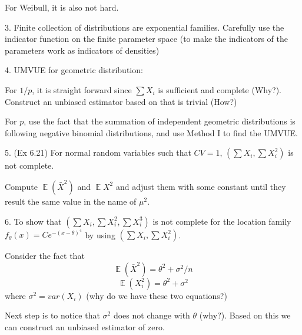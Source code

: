 \documentclass[12pt]{article}
\newcommand{\E}{\operatorname{\mathbb{E}}}
\begin{document}
For Weibull, it is also not hard.

3. Finite collection of distributions are exponential families. Carefully use the indicator function on the finite parameter space (to make the indicators of the parameters work as indicators of densities)

4. UMVUE for geometric distribution:

For $1/p$, it is straight forward since $\sum X_i$ is sufficient and complete (Why?). Construct an unbiased estimator based on that is trivial (How?)

For $p$, use the fact that the summation of independent geometric distributions is following negative binomial distributions, and use Method I to find the UMVUE.

5. (Ex 6.21) For normal random variables such that $CV = 1$, $(\sum X_i, \sum X^2_i)$ is not complete.

Compute $\E (\bar{X}^2)$ and $\E X^2$ and adjust them with some constant until they result the same value in the name of $\mu^2$.

6. To show that $(\sum X_i, \sum X_i^2 , \sum X_i^3)$ is not complete for the location family $ f_\theta(x) = Ce^{-(x-\theta)^4}$ by using $(\sum X_i , \sum X^2_i)$.

Consider the fact that
$$
\E (\bar{X}^2) = \theta^2 + \sigma^2/n
$$
$$
\E (X_i^2) = \theta^2 + \sigma^2
$$
where $\sigma^2 = var(X_i)$ (why do we have these two equations?)

Next step is to notice that $\sigma^2$ does not change with $\theta$ (why?). Based on this we can construct an unbiased estimator of zero.


\end{document}
